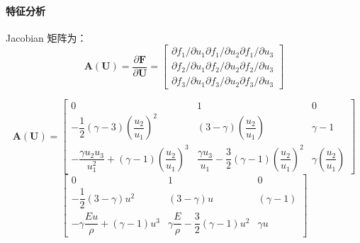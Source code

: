 \documentclass{book}
\begin{document}
\paragraph{特征分析}
Jacobian 矩阵为：
\begin{equation}
  \mathbf{A}(\mathbf{U})=\dfrac{\partial \mathbf{F}}{\partial \mathbf{U}}=\left[\begin{array}{l}
      \partial f_{1} / \partial u_{1} \partial f_{1} / \partial u_{2} \partial f_{1} / \partial u_{3} \\
      \partial f_{2} / \partial u_{1} \partial f_{2} / \partial u_{2} \partial f_{2} / \partial u_{3} \\
      \partial f_{3} / \partial u_{1} \partial f_{3} / \partial u_{2} \partial f_{3} / \partial u_{3}
    \end{array}\right]
\end{equation}

\begin{equation}
  \mathbf{A}(\mathbf{U})=\begin{bmatrix}
    0                                                                                      & 1                                                                                       & 0                                       \\
    -\dfrac{1}{2}(\gamma-3)\left(\dfrac{u_{2}}{u_{1}}\right)^{2}                           & (3-\gamma)\left(\dfrac{u_{2}}{u_{1}}\right)                                             & \gamma-1                                \\
    -\dfrac{\gamma u_{2} u_{3}}{u_{1}^{2}}+(\gamma-1)\left(\dfrac{u_{2}}{u_{1}}\right)^{3} & \dfrac{\gamma u_{3}}{u_{1}}-\dfrac{3}{2}(\gamma-1)\left(\dfrac{u_{2}}{u_{1}}\right)^{2} & \gamma\left(\dfrac{u_{2}}{u_{1}}\right)
  \end{bmatrix}
\end{equation}
\begin{equation}
  \begin{bmatrix}
    0                                          & 1                                                   & 0          \\
    -\dfrac{1}{2}(3-\gamma) u^{2}              & (3-\gamma) u                                        & (\gamma-1) \\
    -\gamma \dfrac{E u}{\rho}+(\gamma-1) u^{3} & \gamma \dfrac{E}{\rho}-\dfrac{3}{2}(\gamma-1) u^{2} & \gamma u
  \end{bmatrix}
\end{equation}
\end{document}
